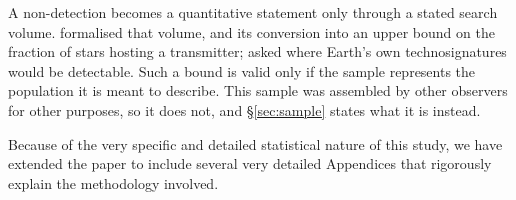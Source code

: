 A non-detection becomes a quantitative statement only through a stated
search volume. \citet{Wright2018} formalised that volume, and
\citet{Margot2023} its conversion into an upper bound on the fraction of
stars hosting a transmitter; \citet{EarthDetectingEarth2025} asked where
Earth's own technosignatures would be detectable. Such a bound is valid
only if the sample represents the population it is meant to describe.
This sample was assembled by other observers for other purposes, so it
does not, and \S\ref{sec:sample} states what it is instead.

Because of the very specific and detailed statistical nature of this study, we have
extended the paper to include several very detailed Appendices that rigorously
explain the methodology involved.

